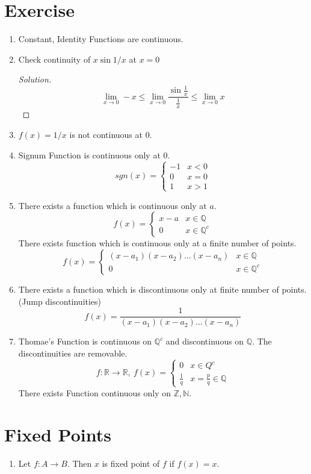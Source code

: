 \section*{Exercise}
\begin{enumerate}
	\item Constant, Identity Functions are continuous.
	\item Check continuity of $x\sin 1/x$ at $x =0$
	\begin{proof}[Solution]
		$$ \lim_{x \to 0} -x \le \lim_{x \to 0} \frac{\sin \frac{1}{x}}{\frac{1}{x}} \le \lim_{x \to 0} x $$
	\end{proof}
	\item $f(x) = 1/x$ is not continuous at $0$.
	\item Signum Function is continuous only at $0$.
		$$ sgn(x) = \begin{cases} -1 & x < 0 \\ 0 & x = 0 \\ 1 & x>1 \end{cases} $$
	\item There exists a function which is continuous only at $a$.
		$$f(x) = \begin{cases} x-a & x \in \mathbb{Q} \\ 0 & x \in \mathbb{Q}^c \end{cases} $$
	\subitem There exists function which is continuous only at a finite number of points.
		$$f(x) = \begin{cases} (x-a_1)(x-a_2)\dots(x-a_n) & x \in \mathbb{Q} \\ 0 & x \in \mathbb{Q}^c \end{cases} $$
	\item There exists a function which is discontinuous only at finite number of points. (Jump discontinuities) 
		$$ f(x) = \frac{1}{(x-a_1)(x-a_2)\dots(x-a_n)} $$
	\item Thomae's Function is continuous on $\mathbb{Q}^c$ and discontinuous on $\mathbb{Q}$. The discontinuities are removable.
		$$ f : \mathbb{R} \to \mathbb{R},\ f(x) = \begin{cases} 0 & x \in Q^c \\ \frac{1}{q} & x = \frac{p}{q} \in \mathbb{Q} \end{cases} $$
	\subitem There exists Function continuous only on $\mathbb{Z},\mathbb{N}$. 
\end{enumerate}

\section{Fixed Points}
\begin{enumerate}
	\item Let $f : A \to B$. Then $x$ is fixed point of $f$ if $f(x) = x$.
\end{enumerate}

